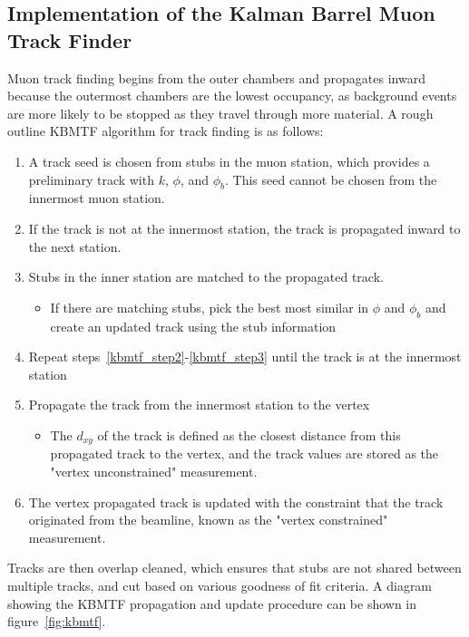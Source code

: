 \subsection{Implementation of the Kalman Barrel Muon Track Finder} \label{sec:kbmtf}
Muon track finding begins from the outer chambers and propagates inward because the outermost chambers are the lowest occupancy, as background events are more likely to be stopped as they travel through more material. A rough outline KBMTF algorithm for track finding is as follows:
\begin{enumerate}
	\item A track seed is chosen from stubs in the muon station, which provides a preliminary track with $k$, $\phi$, and $\phi_{b}$. This seed cannot be chosen from the innermost muon station. \label{kbmtf_step1}
	\item If the track is not at the innermost station, the track is propagated inward to the next station. \label{kbmtf_step2}
	\item Stubs in the inner station are matched to the propagated track. \label{kbmtf_step3}
	\begin{itemize}
		\item If there are matching stubs, pick the best most similar in $\phi$ and $\phi_b$ and create an updated track using the stub information
	\end{itemize}
	\item Repeat steps~\ref{kbmtf_step2}-\ref{kbmtf_step3} until the track is at the innermost station
	\item Propagate the track from the innermost station to the vertex
	\begin{itemize}
		\item The $d_{xy}$ of the track is defined as the closest distance from this propagated track to the vertex, and the track values are stored as the "vertex unconstrained" measurement.
	\end{itemize} \label{kbmtf_step4}
	\item The vertex propagated track is updated with the constraint that the track originated from the beamline, known as the "vertex constrained" measurement. \label{kbmtf_step5}
\end{enumerate}

Tracks are then overlap cleaned, which ensures that stubs are not shared between multiple tracks, and cut based on various goodness of fit criteria. A diagram showing the KBMTF propagation and update procedure can be shown in figure~\ref{fig:kbmtf}.

